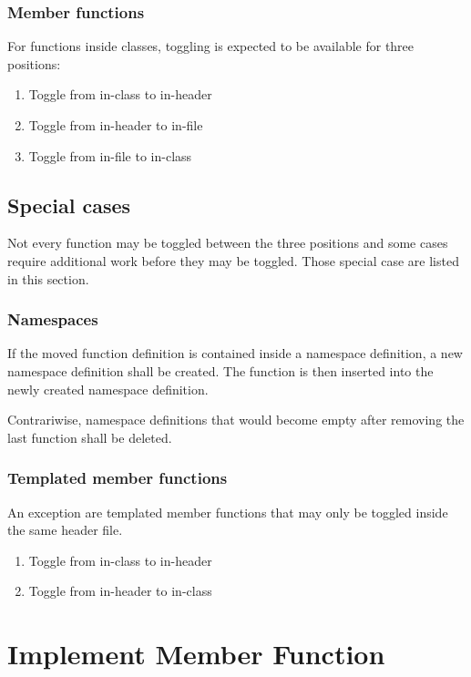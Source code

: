 \subsubsection{Member functions}
For functions inside classes, toggling is expected to be available for three 
positions:
\begin{enumerate}
\item Toggle from in-class to in-header
\item Toggle from in-header to in-file
\item Toggle from in-file to in-class
\end{enumerate}

\subsection{Special cases}

Not every function may be toggled between the three positions and some cases 
require additional work before they may be toggled. Those special case are 
listed in this section.

\subsubsection{Namespaces}

If the moved function definition is contained inside a namespace definition, a 
new namespace definition shall be created. The function is then inserted into 
the newly created namespace definition.

Contrariwise, namespace definitions that would become empty after removing the 
last function shall be deleted.

\subsubsection{Templated member functions}

An exception are templated member functions that may only be toggled inside the 
same header file.
\begin{enumerate}
\item Toggle from in-class to in-header
\item Toggle from in-header to in-class
\end{enumerate}

\section{Implement Member Function}

